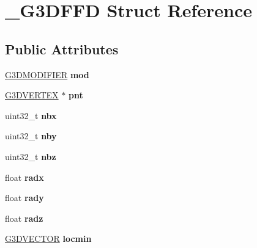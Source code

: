 \hypertarget{struct__G3DFFD}{}\section{\+\_\+\+G3\+D\+F\+FD Struct Reference}
\label{struct__G3DFFD}
\subsection*{Public Attributes}
\begin{DoxyCompactItemize}
\item 
\mbox{\label{struct__G3DFFD_af332a323b8681d06e35240a0b88a151a}} 
\hyperlink{struct__G3DMODIFIER}{G3\+D\+M\+O\+D\+I\+F\+I\+ER} {\bfseries mod}
\item 
\mbox{\label{struct__G3DFFD_a537a90f679633872771e4fa50f5c6987}} 
\hyperlink{struct__G3DVERTEX}{G3\+D\+V\+E\+R\+T\+EX} $\ast$ {\bfseries pnt}
\item 
\mbox{\label{struct__G3DFFD_a4d4c125d64a6327a4f930e6ddb0bba48}} 
uint32\+\_\+t {\bfseries nbx}
\item 
\mbox{\label{struct__G3DFFD_a6be8e719c147b7311bb1546058bed6fc}} 
uint32\+\_\+t {\bfseries nby}
\item 
\mbox{\label{struct__G3DFFD_a5cc7bf7898286cf510a81805ac45389e}} 
uint32\+\_\+t {\bfseries nbz}
\item 
\mbox{\label{struct__G3DFFD_a0c86b2ff94056580c6f60a53feab9f56}} 
float {\bfseries radx}
\item 
\mbox{\label{struct__G3DFFD_a71ab1c0c49438b797fcd4aff9c801068}} 
float {\bfseries rady}
\item 
\mbox{\label{struct__G3DFFD_a5865a0917ae8ba9a5064446fbf138e1b}} 
float {\bfseries radz}
\item 
\mbox{\label{struct__G3DFFD_a82b040804aee92589baff57228d1b604}} 
\hyperlink{struct__G3DVECTOR}{G3\+D\+V\+E\+C\+T\+OR} {\bfseries locmin}
\item 
\mbox{\label{struct__G3DFFD_a10f61d27c00a7e9bc6a503cdb0a75628}} 

\end{DoxyCompactItemize}

